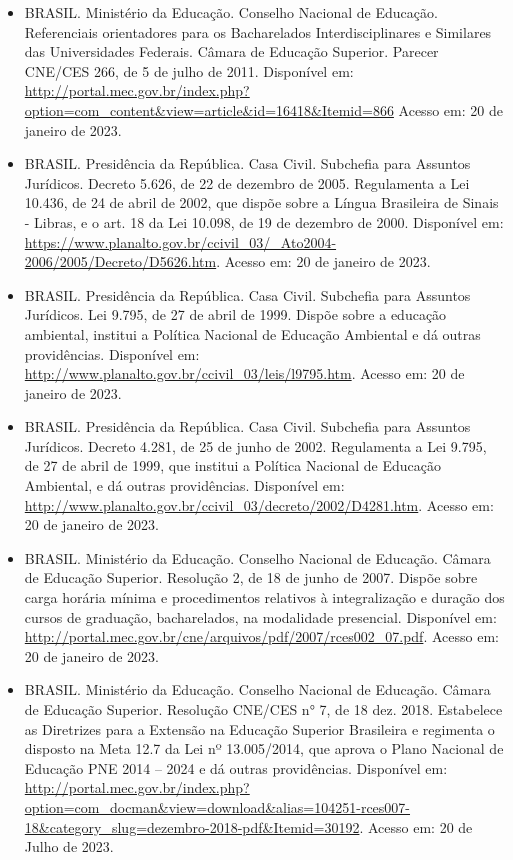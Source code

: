 \begin{itemize}
    \item BRASIL. Ministério da Educação. Conselho Nacional de Educação.
    Referenciais orientadores para os Bacharelados Interdisciplinares e
    Similares das Universidades Federais. Câmara de Educação Superior. Parecer
    CNE/CES 266, de 5 de julho de 2011.
    Disponível em:
    \url{http://portal.mec.gov.br/index.php?option=com_content&view=article&id=16418&Itemid=866}
    Acesso em: 20 de janeiro de 2023.
    
    \item BRASIL. Presidência da República. Casa Civil. Subchefia para Assuntos
    Jurídicos. Decreto 5.626, de 22 de dezembro de 2005. Regulamenta a Lei
    10.436, de 24 de abril de 2002, que dispõe sobre a Língua Brasileira de
    Sinais - Libras, e o art. 18 da Lei 10.098, de 19 de dezembro de 2000.
    Disponível em: \url{https://www.planalto.gov.br/ccivil_03/_Ato2004-2006/2005/Decreto/D5626.htm}.
    Acesso em: 20 de janeiro de 2023.
    
    \item  BRASIL. Presidência da República. Casa Civil. Subchefia para
    Assuntos Jurídicos. Lei 9.795, de 27 de abril de 1999. Dispõe sobre a
    educação ambiental, institui a Política Nacional de Educação Ambiental e dá
    outras providências. 
    Disponível em: \url{http://www.planalto.gov.br/ccivil_03/leis/l9795.htm}.
    Acesso em: 20 de janeiro de 2023.
    
    \item BRASIL. Presidência da República. Casa Civil. Subchefia para Assuntos
    Jurídicos. Decreto 4.281, de 25 de junho de 2002. Regulamenta a Lei 9.795,
    de 27 de abril de 1999, que institui a Política Nacional de Educação
    Ambiental, e dá outras providências. 
    Disponível em: \url{http://www.planalto.gov.br/ccivil_03/decreto/2002/D4281.htm}.
    Acesso em: 20 de janeiro de 2023.
    
    \item BRASIL. Ministério da Educação. Conselho Nacional de Educação. Câmara
    de Educação Superior. Resolução 2, de 18 de junho de 2007. Dispõe sobre
    carga horária mínima e procedimentos relativos à integralização e duração
    dos cursos de graduação, bacharelados, na modalidade presencial. 
    Disponível em: \url{http://portal.mec.gov.br/cne/arquivos/pdf/2007/rces002_07.pdf}.
    Acesso em: 20 de janeiro de 2023.

  \item BRASIL. Ministério da Educação. Conselho Nacional de
    Educação. Câmara de Educação Superior. Resolução CNE/CES n° 7, de
    18 dez. 2018. Estabelece as Diretrizes para a Extensão na Educação
    Superior Brasileira e regimenta o disposto na Meta 12.7 da Lei nº
    13.005/2014, que aprova o Plano Nacional de Educação PNE 2014 –
    2024 e dá outras providências. Disponível em:
    \url{http://portal.mec.gov.br/index.php?option=com_docman&view=download&alias=104251-rces007-18&category_slug=dezembro-2018-pdf&Itemid=30192}.
    Acesso em: 20 de Julho de 2023.
    

\end{itemize}
